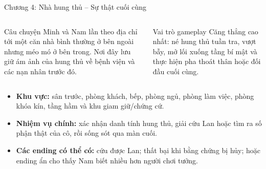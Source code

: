 \documentclass[aspectratio=169,10pt]{beamer}
\begin{document}
\begin{frame}{Chương 4: Nhà hung thủ -- Sự thật cuối cùng}
  \begin{columns}[T,onlytextwidth]
    \begin{block}{Câu chuyện}
      Minh và Nam lần theo địa chỉ tới một căn nhà bình thường ở bên ngoài nhưng méo mó ở bên trong. Nơi đây lưu giữ ám ảnh của hung thủ về bệnh viện và các nạn nhân trước đó.
    \end{block}
    \begin{block}{Vai trò gameplay}
      Căng thẳng cao nhất: né hung thủ tuần tra, vượt bẫy, mở lối xuống tầng bí mật và thực hiện pha thoát thân hoặc đối đầu cuối cùng.
    \end{block}
  \end{columns}

  \vspace{0.2cm}
  \begin{itemize}
    \item \textbf{Khu vực:} sân trước, phòng khách, bếp, phòng ngủ, phòng làm việc, phòng khóa kín, tầng hầm và khu giam giữ/chứng cứ.
    \item \textbf{Nhiệm vụ chính:} xác nhận danh tính hung thủ, giải cứu Lan hoặc tìm ra số phận thật của cô, rồi sống sót qua màn cuối.
    \item \textbf{Các ending có thể có:} cứu được Lan; thất bại khi bằng chứng bị hủy; hoặc ending ẩn cho thấy Nam biết nhiều hơn người chơi tưởng.
  \end{itemize}
\end{frame}
\end{document}

